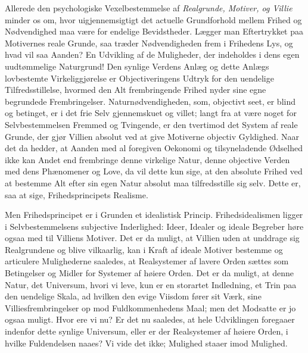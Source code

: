 \documentclass[12pt]{article}
\newcommand{\opage}[1]{\marginnote{\footnotesize\textit{[#1]}}}
\begin{document}
Allerede den psychologiske Vexelbestemmelse af \emph{Realgrunde,
Motiver, og Villie} minder os om, hvor uigjennemsigtigt det actuelle
Grundforhold mellem Frihed og Nødvendighed maa være for endelige
Bevidstheder. Lægger man Eftertrykket paa Motivernes reale Grunde, saa
træder Nødvendigheden frem i Frihedens Lys, og hvad vil saa Aanden? En
Udvikling af de Muligheder, der indeholdes i dens egen uudtømmelige
Naturgrund! Den synlige Verdens Anlæg og dette Anlægs lovbestemte
Virkeliggjørelse er Objectiveringens Udtryk for den uendelige
Tilfredsstillelse, hvormed den Alt frembringende Frihed nyder sine egne
begrundede Frembringelser. Naturnødvendigheden, som, objectivt seet, er
blind og betinget, er i det frie Selv gjennemskuet og villet; langt fra
at være noget for Selvbestemmelsen Fremmed og Tvingende, er den
tvertimod det System af reale Grunde, der gjør Villien absolut ved at
give Motiverne objectiv Gyldighed. Naar det da hedder, at Aanden med al
foregiven Oekonomi og tilsyneladende Ødselhed ikke kan Andet end
frembringe denne virkelige Natur, denne objective Verden med dens
Phænomener og Love, da vil dette kun sige, at den absolute Frihed ved
at bestemme Alt efter sin egen Natur absolut maa tilfredsstille sig
selv. Dette er, saa at sige, Frihedsprincipets Realisme.

Men Frihedsprincipet er i Grunden et idealistisk Princip.
Frihedsidealismen ligger i Selvbestemmelsens subjective Inderlighed:
Ideer, Idealer og ideale Begreber høre ogsaa med til Villiens Motiver.
Det er da muligt, at Villien uden at unddrage sig Realgrundene og blive
vilkaarlig, kan i Kraft af ideale Motiver bestemme og articulere
Mulighederne saaledes, at
\opage{70} Realsystemer af lavere Orden sættes som Betingelser og Midler for
Systemer af høiere Orden. Det er da muligt, at denne Natur, det
Universum, hvori vi leve, kun er en storartet Indledning, et Trin paa
den uendelige Skala, ad hvilken den evige Viisdom fører sit Værk, sine
Villiesfrembringelser op mod Fuldkommenhedens Maal; men det Modsatte er
jo ogsaa muligt. Hvor ere vi nu? Er det nu saaledes, at hele
Udviklingen foregaaer indenfor dette synlige Universum, eller er der
Realsystemer af høiere Orden, i hvilke Fuldendelsen naaes? Vi vide det
ikke; Mulighed staaer imod Mulighed.
\end{document}
